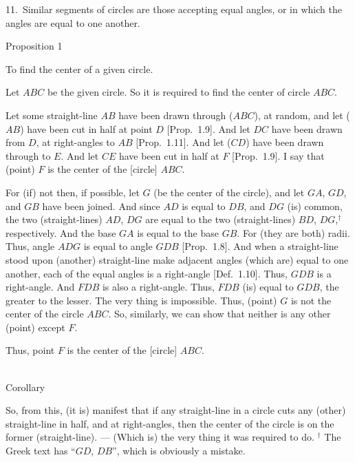 11.~Similar segments of circles are those accepting equal angles, or
in which the angles are equal to one another.


\begin{center}
{\large Proposition 1}
\end{center}

To find the center of a given circle.

Let $ABC$ be the given circle. So it is required to find the center of circle $ABC$.

Let some straight-line $AB$ have been drawn through ($ABC$), at random,
and let ($AB$) have been cut in half at point $D$ 
[Prop.~1.9]. And let
$DC$ have been drawn from $D$, at right-angles to $AB$ [Prop.~1.11].
And let ($CD$) have been drawn through to $E$. And let $CE$ have been cut in half
at $F$ [Prop.~1.9]. I say that (point) $F$ is the center of the [circle] $ABC$.

For (if) not then, if possible, let $G$ (be the center of the circle), and
let $GA$, $GD$, and $GB$ have been joined. And since $AD$ is equal to $DB$,
and $DG$ (is) common, the two (straight-lines) $AD$, $DG$
are equal to the two (straight-lines) $BD$, $DG$,$^\dag$ respectively. And the
base $GA$ is equal to the base $GB$. For (they are both) radii. Thus, angle
$ADG$ is equal to angle $GDB$ [Prop.~1.8]. And when a straight-line
stood upon (another) straight-line make  adjacent angles (which are)
equal to one another, each of the equal angles is a right-angle [Def.~1.10].
Thus, $GDB$ is a right-angle. And $FDB$ is also a right-angle. Thus,
$FDB$ (is) equal to $GDB$, the greater to the lesser. The very thing
is impossible. Thus, (point) $G$ is not the center of the circle $ABC$. 
So, similarly, we can show that neither is any other (point) except $F$.

\epsfysize=2.2in
\centerline{}

Thus, point $F$ is the center of the [circle] $ABC$.

\begin{center}\mbox{}\\
{\large Corollary}
\end{center}

So, from this, (it is) manifest that if any straight-line in a circle
cuts any (other) straight-line in half, and at right-angles, then the center
of the circle is on the former (straight-line). --- (Which is) the very thing it
was required to do.
{\footnotesize \noindent$^\dag$  The Greek text has ``$GD$, $DB$'', which is obviously a mistake.} 

